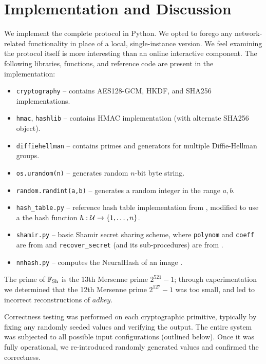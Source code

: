 

\section{Implementation and Discussion} %
\label{sec:implementation_details}

We implement the complete protocol in Python. We opted to forego any network-related functionality in place of a local, single-instance version. We feel examining the protocol itself is more interesting than an online interactive component. The following libraries, functions, and reference code are present in the implementation:
\begin{itemize}
	\item \texttt{cryptography} -- contains AES128-GCM, HKDF, and SHA256 implementations.
	\item \texttt{hmac}, \texttt{hashlib} -- contains HMAC implementation (with alternate SHA256 object).
	\item \texttt{diffiehellman} -- contains primes and generators for multiple Diffie-Hellman groups.
	\item \texttt{os.urandom(n)} -- generates random $n$-bit byte string.
	\item \texttt{random.randint(a,b)} -- generates a random integer in the range $a,b$.
	\item \texttt{hash_table.py} -- reference hash table implementation from \cite{lind2021hash}, modified to use a the hash function $h: \mathcal{U} \to \left\{1,\dots,n\right\}$.
	\item \texttt{shamir.py} -- basic Shamir secret sharing scheme, where \texttt{polynom} and \texttt{coeff} are from \cite{geek2021sha} and  \texttt{recover_secret} (and its sub-procedures) are from \cite{wiki2021sha}. 
	\item \texttt{nnhash.py} -- computes the NeuralHash of an image \cite{ygvarAppleNeuralHash2ONNX2021}.
\end{itemize}
The prime of $\mathbb{F}_{\text{Sh}}$ is the 13th Mersenne prime $2^{521} - 1$; through experimentation we determined that the 12th Mersenne prime $2^{127} - 1$ was too small, and led to incorrect reconstructions of $adkey$.

Correctness testing was performed on each cryptographic primitive, typically by fixing any randomly seeded values and verifying the output. The entire system was subjected to all possible input configurations (outlined below). Once it was fully operational, we re-introduced randomly generated values and confirmed the correctness.



